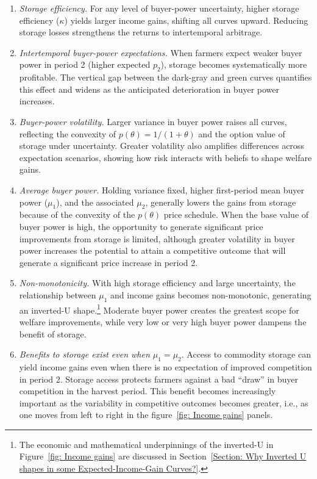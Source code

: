 \begin{enumerate}
    \item \textit{Storage efficiency.}  
    For any level of buyer-power uncertainty, higher storage efficiency ($\kappa$) yields larger income gains, shifting all curves upward. Reducing storage losses strengthens the returns to intertemporal arbitrage.
    
    \item \textit{Intertemporal buyer-power expectations.}  
    When farmers expect weaker buyer power in period 2 (higher expected $p_2$), storage becomes systematically more profitable. The vertical gap between the dark-gray and green curves quantifies this effect and widens as the anticipated deterioration in buyer power increases.

    \item \textit{Buyer-power volatility.}  
    Larger variance in buyer power raises all curves, reflecting the convexity of $p(\theta)=1/(1+\theta)$ and the option value of storage under uncertainty. Greater volatility also amplifies differences across expectation scenarios, showing how risk interacts with beliefs to shape welfare gains.

    \item \textit{Average buyer power.}  
    Holding variance fixed, higher first-period mean buyer power ($\mu_1$), and the associated $\mu_2$, generally lowers the gains from storage because of the convexity of the $p(\theta)$ price schedule. When the base value of buyer power is high, the opportunity to generate significant price improvements from storage is limited, although greater volatility in buyer power increases the potential to attain a competitive outcome that will generate a significant price increase in period 2.

    \item \textit{Non-monotonicity.}  
    With high storage efficiency and large uncertainty, the relationship between $\mu_1$ and income gains becomes non-monotonic, generating an inverted-U shape.\footnote{The economic and mathematical underpinnings of the inverted-U in Figure~\ref{fig: Income gains} are discussed in Section~\ref{Section: Why Inverted U shapes in some Expected-Income-Gain Curves?}.} Moderate buyer power creates the greatest scope for welfare improvements, while very low or very high buyer power dampens the benefit of storage.

    \item \textit{Benefits to storage exist even when $\mu_1=\mu_2$}. Access to commodity storage can yield income gains even when there is no expectation of improved competition in period 2. Storage access protects farmers against a bad ``draw'' in buyer competition in the harvest period. This benefit becomes increasingly important as the variability in competitive outcomes becomes greater, i.e., as one moves from left to right in the figure~\ref{fig: Income gains} panels.
\end{enumerate}


